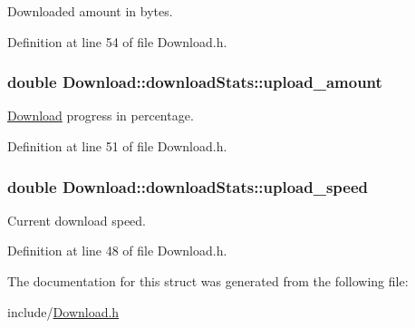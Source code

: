 Downloaded amount in bytes. 



Definition at line 54 of file Download.h.

\hypertarget{structDownload_1_1downloadStats_ac4620bb4ee41620cfed4303ebfd37d4f}{
\subsubsection[{upload\_\-amount}]{\setlength{\rightskip}{0pt plus 5cm}double {\bf Download::downloadStats::upload\_\-amount}}}
\label{structDownload_1_1downloadStats_ac4620bb4ee41620cfed4303ebfd37d4f}


\hyperlink{classDownload}{Download} progress in percentage. 



Definition at line 51 of file Download.h.

\hypertarget{structDownload_1_1downloadStats_a300c31d25c8b994966fe4a792ae8879b}{
\subsubsection[{upload\_\-speed}]{\setlength{\rightskip}{0pt plus 5cm}double {\bf Download::downloadStats::upload\_\-speed}}}
\label{structDownload_1_1downloadStats_a300c31d25c8b994966fe4a792ae8879b}


Current download speed. 



Definition at line 48 of file Download.h.



The documentation for this struct was generated from the following file:\begin{DoxyCompactItemize}
\item 
include/\hyperlink{Download_8h}{Download.h}\end{DoxyCompactItemize}
